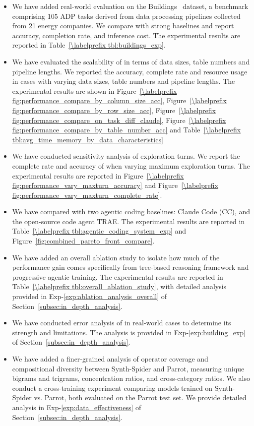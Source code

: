 \begin{itemize}[leftmargin=15pt]
	\item[(1)] We have added real-world evaluation on the Buildings~\cite{sharma2023automatic} dataset, a benchmark comprising 105 ADP tasks derived from data processing pipelines collected from 21 energy companies. We compare \sys with strong baselines and report accuracy, completion rate, and inference cost. The experimental results are reported in Table~\ref{\labelprefix tbl:buildings_exp}.
	\item[(2)] We have evaluated the scalability of \sys in terms of data sizes, table numbers and pipeline lengths. We reported the accuracy, complete rate and resource usage in cases with varying data sizes, table numbers and pipeline lengths. The experimental results are shown in Figure~\ref{\labelprefix fig:performance_compare_by_column_size_acc}, Figure~\ref{\labelprefix fig:performance_compare_by_row_size_acc}, Figure~\ref{\labelprefix fig:performance_compare_on_task_diff_claude}, Figure~\ref{\labelprefix fig:performance_compare_by_table_number_acc} and Table~\ref{\labelprefix tbl:avg_time_memory_by_data_characteristics}
    \item[(3)] We have conducted sensitivity analysis of exploration turns. We report the complete rate and accuracy of \sys when varying maximum exploration turns. The experimental results are reported in Figure~\ref{\labelprefix fig:performance_vary_maxturn_accuracy} and Figure~\ref{\labelprefix fig:performance_vary_maxturn_complete_rate}.
    \item[(4)] We have compared \sys with two agentic coding baselines: Claude Code (CC), and the open-source code agent TRAE. The experimental results are reported in Table~\ref{\labelprefix tbl:agentic_coding_system_exp} and Figure~\ref{fig:combined_pareto_front_compare}.
    \item[(5)] We have added an overall ablation study to isolate how much of the performance gain comes specifically from tree-based reasoning framework and progressive agentic training. The experimental results are reported in Table~\ref{\labelprefix tbl:overall_ablation_study}, with detailed analysis provided in Exp-\ref{exp:ablation_analysis_overall} of Section~\ref{subsec:in_depth_analysis}.
    \item[(6)] We have conducted error analysis of \sys in real-world cases to determine its strength and limitations. The analysis is provided in Exp-\ref{exp:building_exp} of Section~\ref{subsec:in_depth_analysis}.
    \item[(7)] We have added a finer-grained analysis of operator coverage and compositional diversity between Synth-Spider and Parrot, measuring unique bigrams and trigrams, concentration ratios, and cross-category ratios. We also conduct a cross-training experiment comparing models trained on Synth-Spider vs. Parrot, both evaluated on the Parrot test set. We provide detailed analysis in Exp-\ref{exp:data_effectiveness} of Section~\ref{subsec:in_depth_analysis}.
\end{itemize} 


